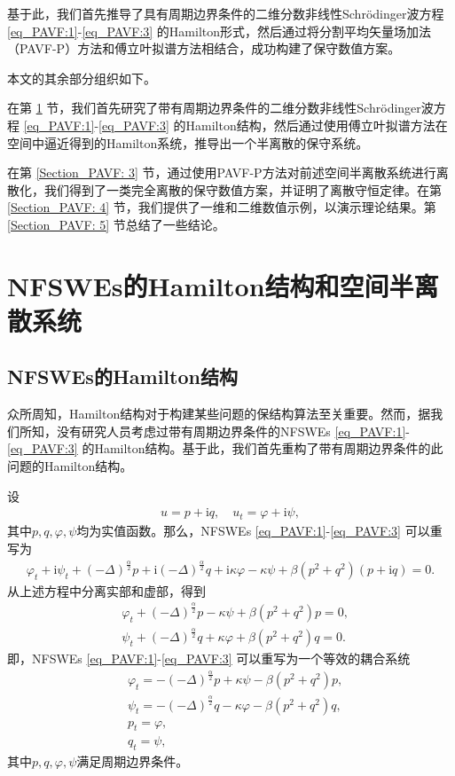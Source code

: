 基于此，我们首先推导了具有周期边界条件的二维分数非线性Schr{\"o}dinger波方程 \eqref{eq_PAVF:1}-\eqref{eq_PAVF:3} 的Hamilton形式，然后通过将分割平均矢量场加法（PAVF-P）方法和傅立叶拟谱方法相结合，成功构建了保守数值方案。

本文的其余部分组织如下。

在第 \ref{Section_PAVF: 2} 节，我们首先研究了带有周期边界条件的二维分数非线性Schr{\"o}dinger波方程 \eqref{eq_PAVF:1}-\eqref{eq_PAVF:3} 的Hamilton结构，然后通过使用傅立叶拟谱方法在空间中逼近得到的Hamilton系统，推导出一个半离散的保守系统。

在第 \ref{Section_PAVF: 3} 节，通过使用PAVF-P方法对前述空间半离散系统进行离散化，我们得到了一类完全离散的保守数值方案，并证明了离散守恒定律。在第 \ref{Section_PAVF: 4} 节，我们提供了一维和二维数值示例，以演示理论结果。第 \ref{Section_PAVF: 5} 节总结了一些结论。

\section{NFSWEs的Hamilton结构和空间半离散系统}\label{Section_PAVF: 2}
\subsection{NFSWEs的Hamilton结构}
众所周知，Hamilton结构对于构建某些问题的保结构算法至关重要。然而，据我们所知，没有研究人员考虑过带有周期边界条件的NFSWEs \eqref{eq_PAVF:1}-\eqref{eq_PAVF:3} 的Hamilton结构。基于此，我们首先重构了带有周期边界条件的此问题的Hamilton结构。

设
\begin{align}
u = p+\mathrm{i}q, \quad u_t = \varphi+ \mathrm{i}\psi,
\end{align}
其中$p, q,\varphi,\psi$均为实值函数。那么，NFSWEs \eqref{eq_PAVF:1}-\eqref{eq_PAVF:3} 可以重写为
\begin{align}\label{eq_PAVF:28}
\varphi_{t}+\mathrm{i}\psi_{t}+\left( -\Delta \right) ^{\frac{\alpha }{2}}p+\mathrm{i}\left( -\Delta \right) ^{\frac{\alpha }{2}}q+\mathrm{i}\kappa \varphi-\kappa \psi+\beta \left( p^{2}+q^{2}\right) \left( p+\mathrm{i} q\right) =0.
\end{align}
从上述方程中分离实部和虚部，得到
\begin{align}
&\varphi_{t}+\left( -\Delta \right) ^{\frac{\alpha }{2}}p-\kappa \psi+\beta \left( p^{2}+q^{2}\right)p=0,\nonumber\\
&\psi_{t}+\left( -\Delta \right) ^{\frac{\alpha }{2}}q+\kappa \varphi+\beta \left( p^{2}+q^{2}\right)q=0.\label{eq_PAVF:29}
\end{align}
即，NFSWEs \eqref{eq_PAVF:1}-\eqref{eq_PAVF:3} 可以重写为一个等效的耦合系统
\begin{align}
&\varphi_{t}=-\left( -\Delta \right) ^{\frac{\alpha }{2}}p+\kappa \psi-\beta \left( p^{2}+q^{2}\right)p\label{eq_PAVF:30},\\
&\psi_{t}=-\left( -\Delta \right) ^{\frac{\alpha }{2}}q-\kappa \varphi-\beta \left( p^{2}+q^{2}\right)q\label{eq_PAVF:31},\\
&p_t=\varphi, \label{eq_PAVF:32}\\
&q_t=\psi, \label{eq_PAVF:33}
\end{align}
其中$p, q,\varphi,\psi$满足周期边界条件。

